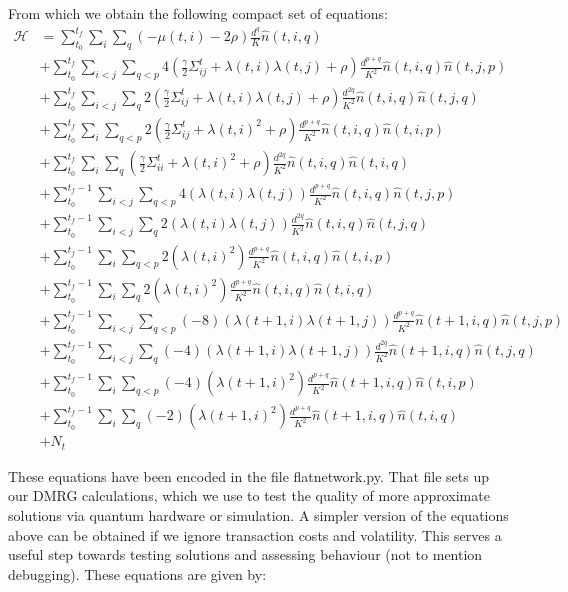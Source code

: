 \documentclass[12pt]{article}
\begin{document}
From which we obtain the following compact set of equations:
\begin{align}
\mathcal{H} &= \sum_{t_0}^{t_f} \sum_i \sum_q (-\mu(t,i) - 2\rho) \frac{d^q}{K} \hat{n}(t,i,q) \nonumber\\
&+  \sum_{t_0}^{t_f} \sum_{i<j} \sum_{q<p} 4(\frac{\gamma}{2} \Sigma^t_{ij} + \lambda(t,i)\lambda(t,j) + \rho)\frac{d^{p+q}}{K^2} \hat{n}(t,i,q)\hat{n}(t,j,p) \nonumber\\
&+  \sum_{t_0}^{t_f} \sum_{i<j} \sum_{q} 2 (\frac{\gamma}{2} \Sigma^t_{ij} + \lambda(t,i)\lambda(t,j) + \rho)\frac{d^{2q}}{K^2} \hat{n}(t,i,q)\hat{n}(t,j,q) \nonumber\\
&+  \sum_{t_0}^{t_f} \sum_{i} \sum_{q<p} 2 (\frac{\gamma}{2} \Sigma^t_{ij} + \lambda(t,i)^2 + \rho)\frac{d^{p+q}}{K^2} \hat{n}(t,i,q)\hat{n}(t,i,p) \nonumber\\
&+  \sum_{t_0}^{t_f} \sum_{i} \sum_{q}  (\frac{\gamma}{2} \Sigma^t_{ii} + \lambda(t,i)^2 + \rho)\frac{d^{2q}}{K^2} \hat{n}(t,i,q)\hat{n}(t,i,q) \nonumber\\
&+  \sum_{t_0}^{t_f-1} \sum_{i<j} \sum_{q<p} 4(\lambda(t,i)\lambda(t,j))\frac{d^{p+q}}{K^2} \hat{n}(t,i,q)\hat{n}(t,j,p) \nonumber\\
&+  \sum_{t_0}^{t_f-1} \sum_{i<j} \sum_{q} 2 (\lambda(t,i)\lambda(t,j))\frac{d^{2q}}{K^2} \hat{n}(t,i,q)\hat{n}(t,j,q) \nonumber\\
&+  \sum_{t_0}^{t_f-1} \sum_{i} \sum_{q<p} 2 (\lambda(t,i)^2)\frac{d^{p+q}}{K^2} \hat{n}(t,i,q)\hat{n}(t,i,p) \nonumber\\
&+  \sum_{t_0}^{t_f-1} \sum_{i} \sum_{q} 2 (\lambda(t,i)^2)\frac{d^{p+q}}{K^2} \hat{n}(t,i,q)\hat{n}(t,i,q) \nonumber\\
&+  \sum_{t_0}^{t_f-1} \sum_{i<j} \sum_{q<p} (-8)(\lambda(t+1,i)\lambda(t+1,j))\frac{d^{p+q}}{K^2} \hat{n}(t+1,i,q)\hat{n}(t,j,p) \nonumber\\
&+  \sum_{t_0}^{t_f-1} \sum_{i<j} \sum_{q} (-4)(\lambda(t+1,i)\lambda(t+1,j))\frac{d^{2q}}{K^2} \hat{n}(t+1,i,q)\hat{n}(t,j,q) \nonumber\\
&+  \sum_{t_0}^{t_f-1} \sum_{i} \sum_{q<p} (-4) (\lambda(t+1,i)^2)\frac{d^{p+q}}{K^2} \hat{n}(t+1,i,q)\hat{n}(t,i,p) \nonumber\\
&+  \sum_{t_0}^{t_f-1} \sum_{i} \sum_{q} (-2) (\lambda(t+1,i)^2)\frac{d^{p+q}}{K^2} \hat{n}(t+1,i,q)\hat{n}(t,i,q) \nonumber\\
&+ N_t
\end{align}

These equations have been encoded in the file flatnetwork.py. That file sets up our DMRG calculations, which we use to test the quality of more approximate solutions via quantum hardware or simulation. A simpler version of the equations above can be obtained if we ignore transaction costs and volatility. This serves a useful step towards testing solutions and assessing behaviour (not to mention debugging). These equations are given by:
\end{document}
